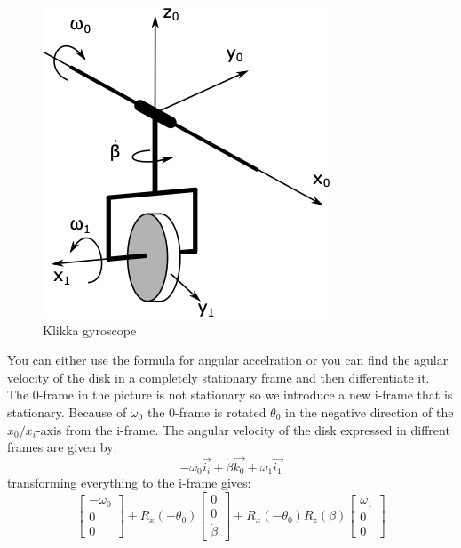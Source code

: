 \begin{figure}[H]
    \centering
    \includegraphics[scale = 0.7]{figures/klikka_eksempel.png}
    \caption{Klikka gyroscope}
    \label{fig:hardcoregyro}
\end{figure}

You can either use the formula for angular accelration or you can find the agular velocity of the disk in a completely stationary frame and then differentiate it. The 0-frame in the picture is not stationary so we introduce a new i-frame that is stationary. Because of $\omega_0$ the 0-frame is rotated $\theta_0$ in the negative direction of the $x_0/x_i$-axis from the i-frame.
The angular velocity of the disk expressed in diffrent frames are given by:
\begin{equation}
    -\omega_0\vec{i_i} + \dot{\beta}\vec{k_0} + \omega_1 \vec{i_1}
\end{equation}
transforming everything to the i-frame gives:
\begin{equation}
    \begin{bmatrix}
        -\omega_0 \\
        0\\
        0
    \end{bmatrix}
    +
    R_x(-\theta_0)
    \begin{bmatrix}
        0 \\
        0\\
        \dot{\beta}
    \end{bmatrix}
    +
    R_x(-\theta_0)R_z(\beta)
    \begin{bmatrix}
        \omega_1 \\
        0\\
        0
    \end{bmatrix}
\end{equation}

